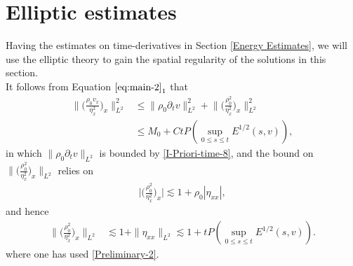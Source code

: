 \documentclass[11pt, reqno]{amsart}
\numberwithin{equation}{section}
\begin{document}
\section{Elliptic estimates}\label{Elliptic estimates}

Having the estimates on time-derivatives in Section \ref{Energy Estimates}, we will use the elliptic theory to gain the spatial regularity of the solutions in this section.\\


 It follows from Equation \(\eqref{eq:main-2}_1\) that
\begin{equation}\label{I-Priori-ellip-1}
\begin{aligned}
\bigg\|\bigg({\frac{\rho_0v_x}{\eta_x^2}}\bigg)_{x}\bigg\|_{L^2}^2
&\leq \|\rho_0\partial_tv\|_{L^2}^2+\bigg\|\bigg({\frac{\rho_0^2}{\eta_x^2}}\bigg)_x\bigg\|_{L^2}^2\\
&\leq M_0+Ct P(\sup_{0\leq s\leq t}E^{1/2}(s,v)),
\end{aligned}
\end{equation}
in which \(\|\rho_0\partial_tv\|_{L^2}\) is bounded by \eqref{I-Priori-time-8}, and the bound on \(\big\|\big({\frac{\rho_0^2}{\eta_x^2}}\big)_x\big\|_{L^2}\) relies on
\begin{equation*}
\begin{aligned}
\bigg|\bigg({\frac{\rho_0^2}{\eta_x^2}}\bigg)_{x}\bigg|\lesssim 1+\rho_0|\eta_{xx}|,
\end{aligned}
\end{equation*}
and hence
\begin{equation}\label{I-Priori-ellip-2}
\begin{aligned}
\bigg\|\bigg({\frac{\rho_0^2}{\eta_x^2}}\bigg)_x\bigg\|_{L^2}
&\lesssim 1+\|\eta_{xx}\|_{L^2}\lesssim 1+t P(\sup_{0\leq s\leq t}E^{1/2}(s,v)).
\end{aligned}
\end{equation}
where one has used \eqref{Preliminary-2}.
\end{document}
